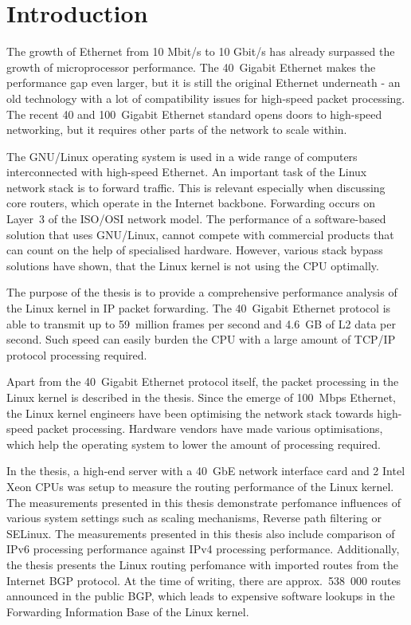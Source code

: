 
\chapter{Introduction}
The growth of Ethernet from 10 Mbit/s to 10 Gbit/s has already surpassed
the growth of microprocessor performance.
The 40~Gigabit Ethernet makes the performance gap even larger, but
it is still the original Ethernet underneath - an old technology
with a lot of compatibility issues for high-speed packet processing.
The recent 40 and 100~Gigabit Ethernet standard opens doors to
high-speed networking, but it requires other parts of the network to scale within.

The GNU/Linux operating system is used in a wide range of computers interconnected with high-speed Ethernet.
An important task of the Linux network stack is to forward traffic.
This is relevant especially when discussing core routers, which operate in the Internet backbone.
Forwarding occurs on Layer~3 of the ISO/OSI network model.
The performance of a software-based solution that uses GNU/Linux, cannot compete
with commercial products that can count on the help of specialised hardware.
However, various stack bypass solutions have shown, that the Linux kernel is not using
the CPU optimally.

The purpose of the thesis is to provide a comprehensive performance analysis of the Linux kernel
in IP packet forwarding.
The 40~Gigabit Ethernet protocol is able to transmit up to 59~million frames per second
and 4.6~GB of L2 data per second.
Such speed can easily burden the CPU with a large amount of TCP/IP protocol processing required.

Apart from the 40~Gigabit Ethernet protocol itself,
the packet processing in the Linux kernel is described in the thesis.
Since the emerge of 100~Mbps Ethernet, the Linux kernel
engineers have been optimising the network stack towards high-speed packet processing.
Hardware vendors have made various optimisations,
which help the operating system to lower the amount of processing required.

In the thesis, a high-end server with a 40~GbE network interface card
and 2 Intel Xeon CPUs was setup to measure the routing performance of the Linux kernel.
The measurements presented in this thesis demonstrate perfomance influences of various system settings
such as scaling mechanisms, Reverse path filtering or SELinux.
The measurements presented in this thesis also include comparison of IPv6 processing performance
against IPv4 processing performance.
Additionally, the thesis presents the Linux routing perfomance with imported routes from the Internet BGP protocol.
At the time of writing, there are approx.~538~000 routes announced in the public BGP,
which leads to expensive software lookups in the Forwarding Information Base of the Linux kernel.

